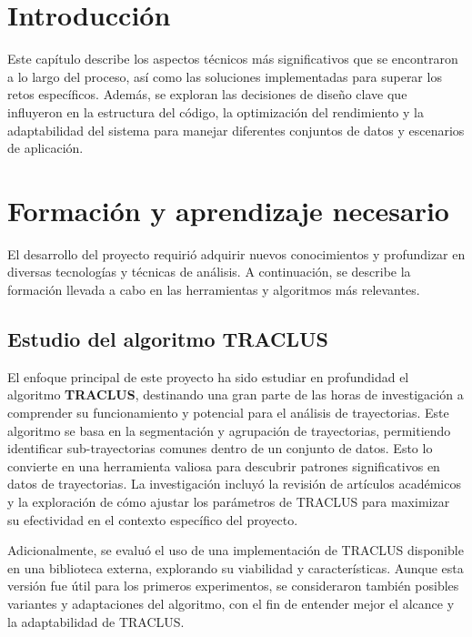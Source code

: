 
\section{Introducción}

Este capítulo describe los aspectos técnicos más significativos que se encontraron a lo largo del proceso, así como las soluciones implementadas para superar los retos específicos. Además, se exploran las decisiones de diseño clave que influyeron en la estructura del código, la optimización del rendimiento y la adaptabilidad del sistema para manejar diferentes conjuntos de datos y escenarios de aplicación.

\section{Formación y aprendizaje necesario}

El desarrollo del proyecto requirió adquirir nuevos conocimientos y profundizar en diversas tecnologías y técnicas de análisis. A continuación, se describe la formación llevada a cabo en las herramientas y algoritmos más relevantes.

\subsection{Estudio del algoritmo TRACLUS}

El enfoque principal de este proyecto ha sido estudiar en profundidad el algoritmo \textbf{TRACLUS}, destinando una gran parte de las horas de investigación a comprender su funcionamiento y potencial para el análisis de trayectorias. Este algoritmo se basa en la segmentación y agrupación de trayectorias, permitiendo identificar sub-trayectorias comunes dentro de un conjunto de datos. Esto lo convierte en una herramienta valiosa para descubrir patrones significativos en datos de trayectorias. La investigación incluyó la revisión de artículos académicos y la exploración de cómo ajustar los parámetros de TRACLUS para maximizar su efectividad en el contexto específico del proyecto.

Adicionalmente, se evaluó el uso de una implementación de TRACLUS disponible en una biblioteca externa, explorando su viabilidad y características. Aunque esta versión fue útil para los primeros experimentos, se consideraron también posibles variantes y adaptaciones del algoritmo, con el fin de entender mejor el alcance y la adaptabilidad de TRACLUS.

